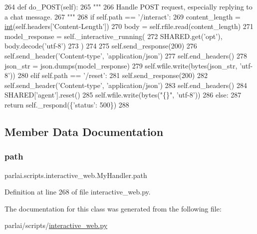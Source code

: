 \begin{DoxyCode}
264     \textcolor{keyword}{def }do\_POST(self):
265         \textcolor{stringliteral}{"""}
266 \textcolor{stringliteral}{        Handle POST request, especially replying to a chat message.}
267 \textcolor{stringliteral}{        """}
268         \textcolor{keywordflow}{if} self.path == \textcolor{stringliteral}{'/interact'}:
269             content\_length = \hyperlink{namespacelanguage__model_1_1eval__ppl_a7d12ee00479673c5c8d1f6d01faa272a}{int}(self.headers[\textcolor{stringliteral}{'Content-Length'}])
270             body = self.rfile.read(content\_length)
271             model\_response = self.\_interactive\_running(
272                 SHARED.get(\textcolor{stringliteral}{'opt'}), body.decode(\textcolor{stringliteral}{'utf-8'})
273             )
274 
275             self.send\_response(200)
276             self.send\_header(\textcolor{stringliteral}{'Content-type'}, \textcolor{stringliteral}{'application/json'})
277             self.end\_headers()
278             json\_str = json.dumps(model\_response)
279             self.wfile.write(bytes(json\_str, \textcolor{stringliteral}{'utf-8'}))
280         \textcolor{keywordflow}{elif} self.path == \textcolor{stringliteral}{'/reset'}:
281             self.send\_response(200)
282             self.send\_header(\textcolor{stringliteral}{'Content-type'}, \textcolor{stringliteral}{'application/json'})
283             self.end\_headers()
284             SHARED[\textcolor{stringliteral}{'agent'}].reset()
285             self.wfile.write(bytes(\textcolor{stringliteral}{"\{\}"}, \textcolor{stringliteral}{'utf-8'}))
286         \textcolor{keywordflow}{else}:
287             \textcolor{keywordflow}{return} self.\_respond(\{\textcolor{stringliteral}{'status'}: 500\})
288 
\end{DoxyCode}


\subsection{Member Data Documentation}
\mbox{\label{classparlai_1_1scripts_1_1interactive__web_1_1MyHandler_ac1cd1a67cc1ed03620292e70d41125a0}} 
\subsubsection{\texorpdfstring{path}{path}}
{\footnotesize\ttfamily parlai.\+scripts.\+interactive\+\_\+web.\+My\+Handler.\+path}



Definition at line 268 of file interactive\+\_\+web.\+py.



The documentation for this class was generated from the following file\+:\begin{DoxyCompactItemize}
\item 
parlai/scripts/\hyperlink{interactive__web_8py}{interactive\+\_\+web.\+py}\end{DoxyCompactItemize}
